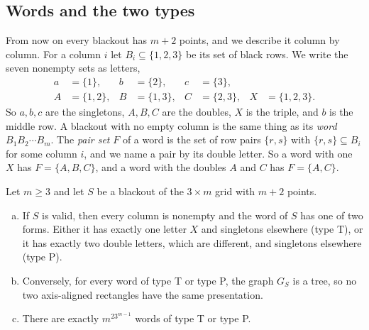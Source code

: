 \subsection{Words and the two types}

From now on every blackout has $m+2$ points, and we describe it column by column. For a
column $i$ let $B_i\subseteq\{1,2,3\}$ be its set of black rows. We write the seven nonempty
sets as letters,
\begin{align*}
a&=\{1\},& b&=\{2\},& c&=\{3\},\\
A&=\{1,2\},& B&=\{1,3\},& C&=\{2,3\},& X&=\{1,2,3\}.
\end{align*}
So $a,b,c$ are the singletons, $A,B,C$ are the doubles, $X$ is the triple, and $b$ is the
middle row. A blackout with no empty column is the same thing as its \emph{word}
$B_1B_2\cdots B_m$. The \emph{pair set} $F$ of a word is the set of row pairs $\{r,s\}$ with
$\{r,s\}\subseteq B_i$ for some column $i$, and we name a pair by its double letter. So a
word with one $X$ has $F=\{A,B,C\}$, and a word with the doubles $A$ and $C$ has $F=\{A,C\}$.

\begin{proposition}\label{prop:threeclass}
Let $m\ge3$ and let $S$ be a blackout of the $3\times m$ grid with $m+2$ points.
\begin{enumerate}[(a)]
\item If $S$ is valid, then every column is nonempty and the word of $S$ has one of two forms.
Either it has exactly one letter $X$ and singletons elsewhere (type T), or it has exactly two
double letters, which are different, and singletons elsewhere (type P).
\item Conversely, for every word of type T or type P, the graph $G_S$ is a tree, so no two
axis-aligned rectangles have the same presentation.
\item There are exactly $m^23^{m-1}$ words of type T or type P.
\end{enumerate}
\end{proposition}

